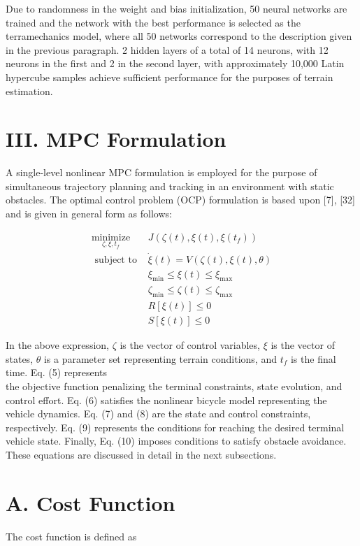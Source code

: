 \documentclass[10pt]{article}
\begin{document}
Due to randomness in the weight and bias initialization, 50 neural networks are trained and the network with the best performance is selected as the terramechanics model, where all 50 networks correspond to the description given in the previous paragraph. 2 hidden layers of a total of 14 neurons, with 12 neurons in the first and 2 in the second layer, with approximately 10,000 Latin hypercube samples achieve sufficient performance for the purposes of terrain estimation.

\section*{III. MPC Formulation}
A single-level nonlinear MPC formulation is employed for the purpose of simultaneous trajectory planning and tracking in an environment with static obstacles. The optimal control problem (OCP) formulation is based upon [7], [32] and is given in general form as follows:

\[
\begin{array}{cl}
\underset{\zeta, \xi, t_{f}}{\operatorname{minimize}} & J\left(\zeta(t), \xi(t), \xi\left(t_{f}\right)\right) \\
\text { subject to } & \dot{\xi}(t)=V(\zeta(t), \xi(t), \theta) \\
& \xi_{\min } \leq \xi(t) \leq \xi_{\max } \\
& \zeta_{\min } \leq \zeta(t) \leq \zeta_{\max } \\
& R[\xi(t)] \leq 0 \\
& S[\xi(t)] \leq 0 \tag{10}
\end{array}
\]

In the above expression, $\zeta$ is the vector of control variables, $\xi$ is the vector of states, $\theta$ is a parameter set representing terrain conditions, and $t_{f}$ is the final time. Eq. (5) represents\\
the objective function penalizing the terminal constraints, state evolution, and control effort. Eq. (6) satisfies the nonlinear bicycle model representing the vehicle dynamics. Eq. (7) and (8) are the state and control constraints, respectively. Eq. (9) represents the conditions for reaching the desired terminal vehicle state. Finally, Eq. (10) imposes conditions to satisfy obstacle avoidance. These equations are discussed in detail in the next subsections.

\section*{A. Cost Function}
The cost function is defined as
\end{document}
